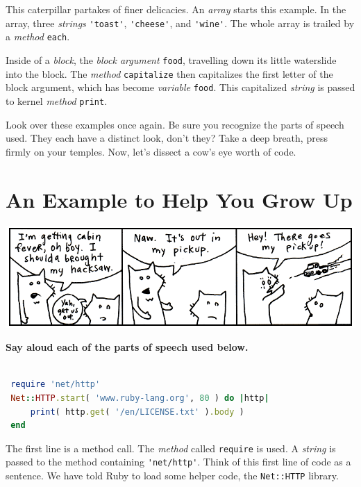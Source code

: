 \documentclass[10pt,twoside]{report}
\begin{document}
This caterpillar partakes of finer delicacies.  An {\em array} starts
this example.  In the array, three {\em strings}
\lstinline[breaklines=true]|'toast'|,
\lstinline[breaklines=true]|'cheese'|, and
\lstinline[breaklines=true]|'wine'|.  The whole array is trailed by a
          {\em method} \lstinline[breaklines=true]|each|.

Inside of a {\em block}, the {\em block argument}
\lstinline[breaklines=true]|food|, travelling down its little
waterslide into the block.  The {\em method}
\lstinline[breaklines=true]|capitalize| then capitalizes the first
letter of the block argument, which has become {\em variable}
\lstinline[breaklines=true]|food|.  This capitalized {\em string} is
passed to kernel {\em method} \lstinline[breaklines=true]|print|.

Look over these examples once again.  Be sure you recognize the parts
of speech used.  They each have a distinct look, don't they?  Take a
deep breath, press firmly on your temples.  Now, let's dissect a cow's
eye worth of code.


\section{An Example to Help You Grow Up}


	\includegraphics[width=1.0\textwidth]{cache/17.png}

{\bf Say aloud each of the parts of speech used below.}


\begin{lstlisting}[basicstyle=\ttfamily\color{basiccolor},
    commentstyle = \ttfamily\color{commentcolor},
    keywordstyle=\ttfamily\color{keywordscolor},
    stringstyle=\color{stringcolor},
    language=Ruby,
    basicstyle=\small\ttfamily,
    showstringspaces=false,
  ]

 require 'net/http' 
 Net::HTTP.start( 'www.ruby-lang.org', 80 ) do |http| 
     print( http.get( '/en/LICENSE.txt' ).body ) 
 end

\end{lstlisting}


The first line is a method call.  The {\em method} called
\lstinline[breaklines=true]|require| is used.  A {\em string} is
passed to the method containing
\lstinline[breaklines=true]|'net/http'|.  Think of this first line of
code as a sentence.  We have told Ruby to load some helper code, the
\lstinline[breaklines=true]|Net::HTTP| library.
\end{document}
